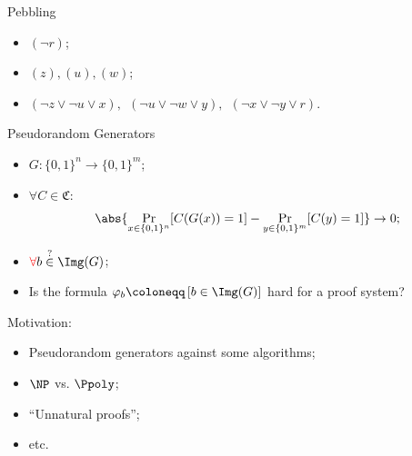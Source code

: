 \begin{frame}{Pebbling}

    \begin{center}
                
    \end{center}

    \pause
    \begin{itemize}
        \item $(\neg r)$;
            \pause
        \item $(z), (u), (w)$;
            \pause
        \item $(\neg z \lor \neg u \lor x), ~~ (\neg u \lor \neg w \lor y), ~~ (\neg x \lor \neg y \lor
            r)$.
    \end{itemize}

    \pause
    
\end{frame}


\begin{frame}{Pseudorandom Generators}

    \begin{itemize}
        \item $G\colon \{0, 1\}^n \to \{0, 1\}^m$;
            \pause
        \item $\forall C \in \mathfrak{C}:$
            $$
                \abs{\Pr\limits_{x \in \{0, 1\}^n}[C(G(x)) = 1] -
                \Pr\limits_{y \in \{0, 1\}^m}[C(y) = 1]} \to 0;
            $$
            \pause
        \item $\textcolor{red}{\forall}b \stackrel{?}{\in} \Img(G)$;
            \pause
        \item Is the formula $\varphi_b \coloneqq \left[ b \in \Img(G) \right]$ hard for a proof system?
    \end{itemize}

    \pause
    \vspace{0.3cm}
    Motivation:
    \begin{itemize}
        \item Pseudorandom generators against some algorithms;
        \item $\NP$ vs. $\Ppoly$;
        \item ``Unnatural proofs'';
        \item etc. 
    \end{itemize}
\end{frame}


